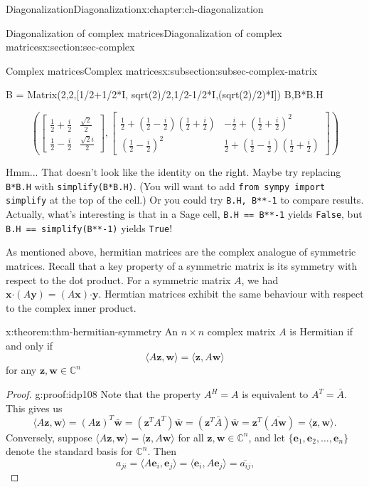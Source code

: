\documentclass[oneside,10pt,]{book}
\newcommand{\mono}[1]{\texttt{#1}}
\numberwithin{equation}{section}
\newcommand{\bbm}{\begin{bmatrix}}
\newcommand{\ebm}{\end{bmatrix}}
\newcommand{\C}{\mathbb{C}}
\newcommand{\dotp}{\!\boldsymbol{\cdot}\!}
\newcommand{\zz}{\mathbf{z}}
\newcommand{\ww}{\mathbf{w}}
\newcommand{\basis}[2]{\{\mathbf{#1}_1,\mathbf{#1}_2,\ldots,\mathbf{#1}_{#2}\}}
\newcommand{\amp}{&}
\begin{document}
\begin{chapterptx}{Diagonalization}{}{Diagonalization}{}{}{x:chapter:ch-diagonalization}
\begin{sectionptx}{Diagonalization of complex matrices}{}{Diagonalization of complex matrices}{}{}{x:section:sec-complex}
\begin{subsectionptx}{Complex matrices}{}{Complex matrices}{}{}{x:subsection:subsec-complex-matrix}
\begin{sageinput}
B = Matrix(2,2,[1/2+1/2*I, sqrt(2)/2,1/2-1/2*I,(sqrt(2)/2)*I])
B,B*B.H
\end{sageinput}
\begin{sageoutput}
\[\left(\bbm \frac12+\frac{i}{2}\amp \frac{\sqrt{2}}{2}\\ \frac12-\frac{i}{2}\amp \frac{\sqrt{2}i}{2}\ebm,
 \bbm \frac12 + \left(\frac12-\frac{i}{2}\right)\left(\frac12+\frac{i}{2}\right)\amp
-\frac{i}{2}+\left(\frac12+\frac{i}{2}\right)^2\\ \left(\frac12-\frac{i}{2}\right)^2\amp
\frac12 + \left(\frac12-\frac{i}{2}\right)\left(\frac12+\frac{i}{2}\right)\ebm\right)\]
\end{sageoutput}
Hmm... That doesn't look like the identity on the right. Maybe try replacing \mono{B*B.H} with \mono{simplify(B*B.H)}. (You will want to add \mono{from sympy import simplify} at the top of the cell.) Or you could try \mono{B.H, B**-1} to compare results. Actually, what's interesting is that in a Sage cell, \mono{B.H == B**-1} yields \mono{False}, but \mono{B.H == simplify(B**-1)} yields \mono{True}!%
\par
As mentioned above, hermitian matrices are the complex analogue of symmetric matrices. Recall that a key property of a symmetric matrix is its symmetry with respect to the dot product. For a symmetric matrix \(A\), we had \(\mathbf{x}\dotp (A\mathbf{y})=(A\mathbf{x})\dotp \mathbf{y}\). Hermtian matrices exhibit the same behaviour with respect to the complex inner product.%
\begin{theorem}{}{}{x:theorem:thm-hermitian-symmetry}%
An \(n\times n\) complex matrix \(A\) is Hermitian if and only if%
\begin{equation*}
\langle A\zz,\ww\rangle = \langle \zz, A\ww\rangle
\end{equation*}
for any \(\zz,\ww\in\C^n\)%
\end{theorem}
\begin{proof}{}{g:proof:idp108}
Note that the property \(A^H=A\) is equivalent to \(A^T=\bar{A}\). This gives us%
\begin{equation*}
\langle A\zz,\ww\rangle = (A\zz)^T\bar{\ww} = (\zz^TA^T)\bar{\ww} = (\zz^T\bar{A})\bar{\ww}=\zz^T(\overline{A\ww}) = \langle \zz,\ww\rangle\text{.}
\end{equation*}
Conversely, suppose \(\langle A\zz,\ww\rangle = \langle \zz, A\ww\rangle\) for all \(\zz,\ww\in \C^n\), and let \(\basis{e}{n}\) denote the standard basis for \(\C^n\). Then%
\begin{equation*}
a_{ji}=\langle A\mathbf{e}_i,\mathbf{e}_j\rangle = \langle \mathbf{e}_i,A\mathbf{e}_j\rangle = \overline{a_{ij}}\text{,}

\end{equation*}
\end{proof}
\end{subsectionptx}
\end{sectionptx}
\end{chapterptx}
\end{document}
